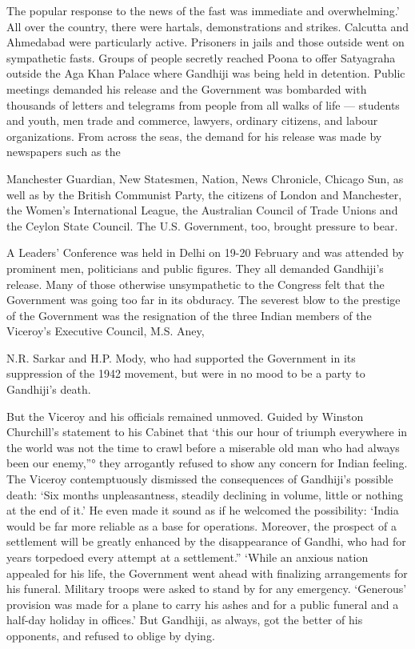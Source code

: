 The popular response to the news of the fast was immediate and overwhelming.’ All over the country, there were hartals, demonstrations and strikes. Calcutta and Ahmedabad were particularly active. Prisoners in jails and those outside went on sympathetic fasts. Groups of people secretly reached Poona to offer Satyagraha outside the Aga Khan Palace where Gandhiji was being held in detention. Public meetings demanded his release and the Government was bombarded with thousands of letters and telegrams from people from all walks of life — students and youth, men trade and commerce, lawyers, ordinary citizens, and labour organizations. From across the seas, the demand for his release was made by newspapers such as the

Manchester Guardian, New Statesmen, Nation, News Chronicle, Chicago Sun, as well as by the British Communist Party, the citizens of London and Manchester, the Women’s International League, the Australian Council of Trade Unions and the Ceylon State Council. The U.S. Government, too, brought pressure to bear.

A Leaders’ Conference was held in Delhi on 19-20 February and was attended by prominent men, politicians and public figures. They all demanded Gandhiji’s release. Many of those otherwise unsympathetic to the Congress felt that the Government was going too far in its obduracy. The severest blow to the prestige of the Government was the resignation of the three Indian members of the Viceroy’s Executive Council, M.S. Aney,

N.R. Sarkar and H.P. Mody, who had supported the Government in its suppression of the 1942 movement, but were in no mood to be a party to Gandhiji’s death.

But the Viceroy and his officials remained unmoved. Guided by Winston Churchill’s statement to his Cabinet that ‘this our hour of triumph everywhere in the world was not the time to crawl before a miserable old man who had always been our enemy,”° they arrogantly refused to show any concern for Indian feeling. The Viceroy contemptuously dismissed the consequences of Gandhiji’s possible death: ‘Six months unpleasantness, steadily declining in volume, little or nothing at the end of it.’ He even made it sound as if he welcomed the possibility: ‘India would be far more reliable as a base for operations. Moreover, the prospect of a settlement will be greatly enhanced by the disappearance of Gandhi, who had for years torpedoed every attempt at a settlement.” ‘While an anxious nation appealed for his life, the Government went ahead with finalizing arrangements for his funeral. Military troops were asked to stand by for any emergency. ‘Generous’ provision was made for a plane to carry his ashes and for a public funeral and a half-day holiday in offices.’ But Gandhiji, as always, got the better of his opponents, and refused to oblige by dying.

